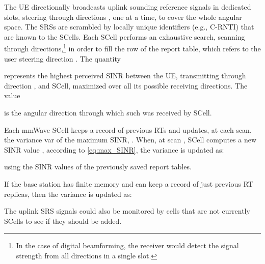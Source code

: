 \documentclass[conference,a4paper]{IEEEtran}
\begin{document}
The UE directionally broadcasts uplink sounding reference signals in dedicated slots, steering through directions , one  at a time, to cover the whole angular space.
The SRSs are scrambled by locally unique identifiers (e.g., C-RNTI) that are known to the 
SCells. Each SCell performs an exhaustive search, scanning through  directions,\footnote{In the case of digital beamforming, the receiver would detect the signal strength from all directions in a single slot.} in order to fill  the  row of the report table, which refers to the user steering direction . The quantity


represents the highest perceived SINR between the UE, transmitting through direction , and SCell, maximized over all its possible receiving directions. The value

is the angular direction through which such  was received by SCell.

Each mmWave SCell 
keeps a record of previous RTs and updates, at each scan, the variance var of the maximum SINR, . When, at scan ,  SCell computes a new SINR value , according to \eqref{eq:max_SINR}, the variance is updated as:

using the SINR values of the previously saved report tables.

If the base station has finite memory and can keep a record of just  previous RT replicas, then the variance is updated as:




The uplink SRS signals could also be monitored by cells that are not currently SCells
to see if they should be added.\\
\end{document}
